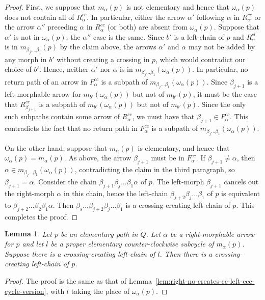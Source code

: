 \documentclass{article}
\newtheorem{lemma}[thm]{Lemma}
\theoremstyle{definition}
\begin{document}
\begin{proof}
	First, we suppose that $m_\alpha(p)$ is not elementary and hence that $\omega_\alpha(p)$ does not contain all of $R_\alpha^{cc}$. In particular, either the arrow $\alpha'$ following $\alpha$ in $R_\alpha^{cc}$ or the arrow $\alpha''$ preceding $\alpha$ in $R_\alpha^{cc}$ (or both) are absent from $\omega_\alpha(p)$. Suppose that $\alpha'$ is not in $\omega_\alpha(p)$; the $\alpha''$ case is the same. 
	Since $b'$ is a left-chain of $p$ and $R_\alpha^{cl}$ is in $m_{\beta_{j'}\dots\beta_{1}}(p)$  by the claim above, the arrows $\alpha'$ and $\alpha$ may not be added by any morph in $b'$ without creating a crossing in $p$, which would contradict our choice of $b'$. Hence, neither $\alpha'$ nor $\alpha$ is in $m_{\beta_j\dots\beta_1}(\omega_\alpha(p))$. In particular, no return path of an arrow in $F_\alpha^{cc}$ is a subpath of $m_{\beta_j\dots\beta_1}(\omega_\alpha(p))$. 
	Since $\beta_{j+1}$ is a left-morphable arrow for $m_{b'}(\omega_\alpha(p))$ but not of $m_{b'}(p)$, it must be the case that $R_{\beta_{j+1}}^{cc}$ is a subpath of $m_{b'}(\omega_\alpha(p))$ but not of $m_{b'}(p)$. Since the only such subpaths contain some arrow of $R_\alpha^{cc}$, we must have that $\beta_{j+1}\in F_\alpha^{cc}$. This contradicts the fact that no return path in $F_\alpha^{cc}$ is a subpath of $m_{\beta_j\dots\beta_1}(\omega_\alpha(p))$.

	On the other hand, suppose that $m_\alpha(p)$ is elementary, and hence that $\omega_\alpha(p)=m_\alpha(p)$. 
		As above, the arrow $\beta_{j+1}$ must be in $F_\alpha^{cc}$. 
		If $\beta_{j+1}\neq\alpha$, then $\alpha\in m_{\beta_j\dots\beta_1}(\omega_\alpha(p))$, contradicting the claim in the third paragraph, so $\beta_{j+1}=\alpha$.
	Consider the chain $\beta_{j+1}\beta_j\dots\beta_1\alpha$ 
	of $p$. The left-morph $\beta_{j+1}$ cancels out the right-morph $\alpha$ in this chain, hence the left-chain $\beta_{j+2}\beta_j\dots\beta_1$ 
	of $p$ is equivalent to $\beta_{j+2}\dots\beta_2\beta_1\alpha$. 
	Then $\beta_s\dots\beta_{j+2}\beta_j\dots\beta_1$ 
	is a crossing-creating left-chain of $p$. This completes the proof.

\end{proof}

\begin{lemma}\label{lem:right-creates-cc-left-ccc-cycle-version}
	Let $p$ be an elementary 
	path in $\widetilde Q$. Let $\alpha$ be a right-morphable arrow for $p$ and let $l$ be a proper elementary counter-clockwise subcycle of $m_\alpha(p)$. Suppose there is a crossing-creating left-chain of $l$. Then there is a crossing-creating left-chain of $p$.
\end{lemma}
\begin{proof}
	The proof is the same as that of Lemma~\ref{lem:right-no-creates-cc-left-ccc-cycle-version}, with $l$ taking the place of $\omega_\alpha(p)$.
\end{proof}
\end{document}
